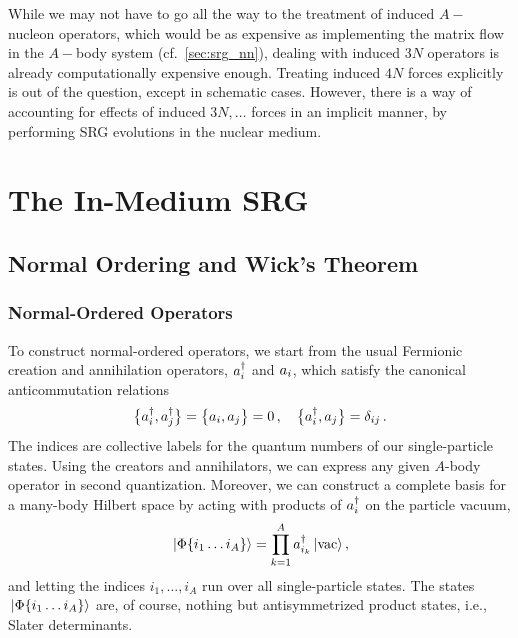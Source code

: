 While we may not have to go all the way to the treatment of induced
$A-$nucleon operators, which would be as expensive as implementing 
the matrix flow in the $A-$body system (cf.~\ref{sec:srg_nn}),
dealing with induced $3N$ operators is already computationally 
expensive enough. Treating induced $4N$ forces explicitly is out 
of the question, except in schematic cases. However, there is a
way of accounting for effects of induced $3N,\ldots$ forces in
an implicit manner, by performing SRG evolutions in the nuclear
medium. 


\section{\label{sec:imsrg}The In-Medium SRG}
\tbd{[Bridge]}

\subsection{\label{sec:nord}Normal Ordering and Wick's Theorem}


%
%
\subsubsection{\label{sec:nord_ops}Normal-Ordered Operators}
To construct normal-ordered operators, we start from the usual Fermionic
creation and annihilation operators, $a^\dag_i$ and $a_i$, which satisfy
the canonical anticommutation relations
\begin{equation}
   \big\{ {a^\dag_i}, {a^\dag_j} \big\}  =  \big\{ {a_i}, {a_j} \big\}  = 0\,,\quad  \big\{ {a^\dag_i}, {a_j} \big\} =\delta_{ij}\,.
\end{equation}
The indices are collective labels for the quantum numbers of our single-particle 
states. Using the creators and annihilators, we can express any given $A$-body 
operator in second quantization. Moreover, we can construct a complete basis 
for a many-body Hilbert space by acting with products of $a^\dag_i$ on the particle 
vacuum,
\begin{equation}\label{eq:vacbasis}
  \ket{\Phi\{i_1\ldots i_A\}}=\prod_{k=1}^A\aaO_{i_k}\ket{\text{vac}}\,,
\end{equation}
and letting the indices $i_1,\ldots,i_A$ run over all single-particle states.
The states $\,|{\Phi\{i_1\ldots i_A\}}\rangle$ are, of course, nothing but 
antisymmetrized product states, i.e., Slater determinants.

